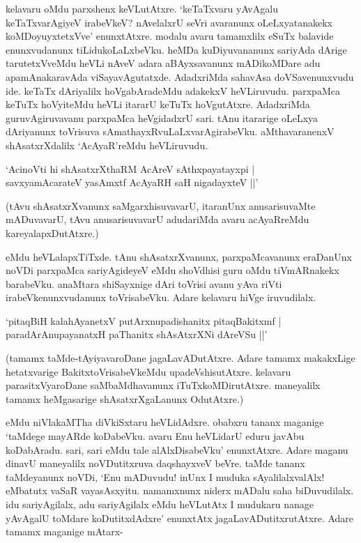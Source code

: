 kelavaru oMdu parxshenx keVLutAtxre. `keTaTxvaru yAvAgalu keTaTxvarAgiyeV irabeVkeV? nAvelalxrU seVri avaranunx oLeLxyatanakekx koMDoyuyxtetxVve' enunxtAtxre. modalu avaru tamamxlilx eSuTx balavide enunxvudanunx tiLidukoLaLxbeVku. heMDa kuDiyuvananunx sariyAda dArige tarutetxVveMdu heVLi nAveV adara aBAyxsavanunx mADikoMDare adu apamAnakaravAda viSayavAgutatxde. AdadxriMda sahavAsa doVSavenunxvudu ide. keTaTx dAriyalilx hoVgabAradeMdu adakekxV heVLiruvudu. parxpaMca keTuTx hoVyiteMdu heVLi itararU keTuTx hoVgutAtxre. AdadxriMda guruvAgiruvavanu parxpaMca heVgidadxrU sari. tAnu itararige oLeLxya dAriyanunx toVrisuva sAmathayxRvuLaLxvarAgirabeVku. aMthavaranenxV shAsatxrXdalilx `AcAyaR'reMdu heVLiruvudu. 

\begin{shloka} 
`AcinoVti hi shAsatxrXthaRM AcAreV sAthxpayatayxpi |\\
savxyamAcarateV yasAmxtf AcAyaRH saH nigadayxteV ||'
\end{shloka}

(tAvu shAsatxrXvanunx saMgarxhisuvavarU, itaranUnx anusarisuvaMte mADuvavarU, tAvu anusarisuvavarU adudariMda avaru acAyaRreMdu kareyalapxDutAtxre.)

eMdu heVLalapxTiTxde. tAnu shAsatxrXvanunx, parxpaMcavanunx eraDanUnx noVDi parxpaMca sariyAgideyeV eMdu shoVdhisi guru oMdu tiVmARnakekx barabeVku. anaMtara shiSayxnige dAri toVrisi avanu yAva riVti irabeVkenunxvudanunx toVrisabeVku. Adare kelavaru hiVge iruvudilalx. 


\begin{shloka}
`pitaqBiH kalahAyanetxV putArxnupadishanitx pitaqBakitxmf |\\
paradArAnupayanatxH paThanitx shAsAtxrXNi dAreVSu ||'
\end{shloka}

(tamamx taMde-tAyiyavaroDane jagaLavADutAtxre. Adare tamamx makakxLige hetatxvarige BakitxtoVrisabeVkeMdu upadeVshisutAtxre. kelavaru parasitxVyaroDane saMbaMdhavanunx iTuTxkoMDirutAtxre. maneyalilx tamamx heMgasarige shAsatxrXgaLanunx OdutAtxre.)

eMdu niVlakaMTha diVkiSxtaru heVLidAdxre. obabxru tananx maganige `taMdege mayARde koDabeVku. avaru Enu heVLidarU eduru javAbu koDabAradu. sari, sari eMdu tale alAlxDisabeVku' enunxtAtxre. Adare maganu dinavU maneyalilx noVDutitxruva daqshayxveV beVre. taMde tananx taMdeyanunx noVDi, `Enu mADuvudu! inUnx I muduka sAyalilalxvalAlx! eMbatutx vaSaR vayasAsxyitu. namamxnunx niderx mADalu saha biDuvudilalx. idu sariyAgilalx, adu sariyAgilalx eMdu heVLutAtx I mudukaru nanage yAvAgalU toMdare koDutitxdAdxre' enunxtAtx jagaLavADutitxrutAtxre. Adare tamamx maganige mAtarx-

